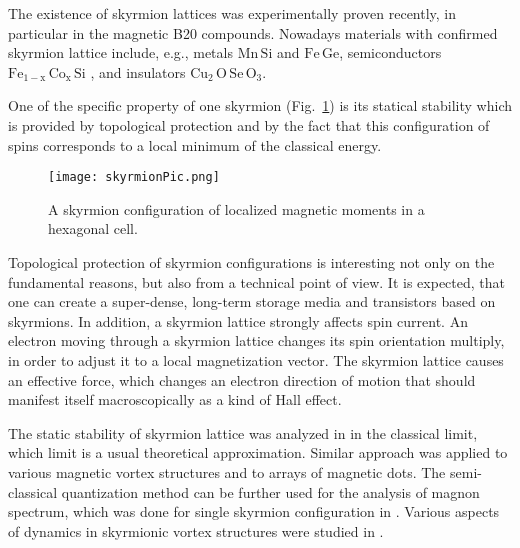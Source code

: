 \documentclass[aps,prb,twocolumn,superscriptaddress,nobalancelastpage]{revtex4-1}
\begin{document}
The existence of skyrmion lattices was  experimentally proven recently, in particular in the magnetic B20 compounds. \cite{PhysRevB.85.174416, Muhlbauer2009, Yu2010, Yu2010a, Grigoriev2007}  Nowadays materials with confirmed skyrmion lattice include, e.g., metals $\mathrm{Mn\,Si}$ and $\mathrm{Fe\,Ge}$, semiconductors $\mathrm{Fe_{1-x}\,Co_x\,Si}$ \cite{PhysRevB.81.041203, PhysRevB.89.064416}, and insulators $\mathrm{Cu_2\,O\, Se\, O_3}$.\cite{Nagaosa2013}

One of the specific property of one skyrmion (Fig.\ \ref{pic:skyrmion}) is its statical stability which is provided by topological protection and by the fact that this configuration of spins corresponds to a local minimum of the classical energy. \cite{Belavin1975} 

\begin{figure}[h]
\texttt{[image: skyrmionPic.png]}
\caption{A skyrmion configuration of localized magnetic moments  in a hexagonal cell.}
\label{pic:skyrmion}
\end{figure}

Topological protection of skyrmion configurations is interesting not only on the fundamental reasons, but also from a technical point of view. It is expected, that one can create a super-dense, long-term storage media \cite{Kiselev2011, Fert2013} and transistors \cite{Zhang2015} based on skyrmions. In addition, a skyrmion lattice strongly affects spin current. An electron moving through a skyrmion lattice changes its spin orientation multiply, in order to adjust it to a local magnetization vector. The skyrmion lattice causes an effective force, which changes an electron direction of motion that should manifest itself macroscopically as a kind of Hall effect. \cite{PhysRevB.94.024431} 

The static stability of skyrmion lattice was analyzed in \cite{Bogdanov1994}  in the classical limit, which limit is a usual theoretical approximation.  Similar approach was applied to various magnetic vortex structures \cite{metlov2002, metlov2010} and to arrays of magnetic dots. \cite{Galkin2006}  The semi-classical quantization method can be further used for the analysis of magnon spectrum, which was done for single skyrmion configuration in \cite{Schutte2014,Aristov2015, Aristov2016b}. 
Various aspects of  dynamics in  skyrmionic vortex structures were studied in \cite{Ivanov2002, Butenko2010, Dai2013, Ivanov1995, Ivanov1999}.
\end{document}
